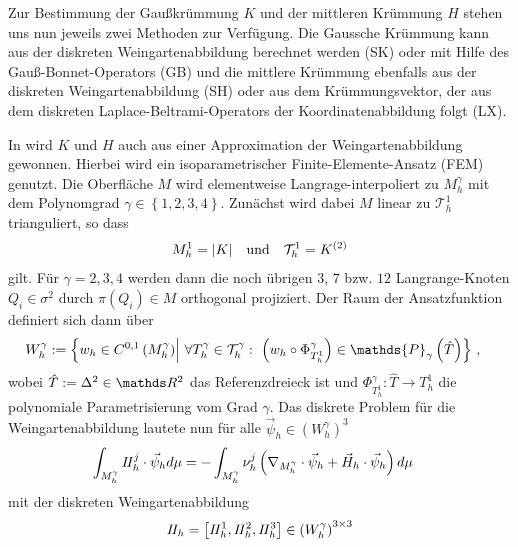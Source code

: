   Zur Bestimmung der Gaußkrümmung \( K \) und der mittleren Krümmung \( H \) stehen uns nun jeweils zwei Methoden zur Verfügung.
  Die Gaussche Krümmung kann aus der diskreten Weingartenabbildung berechnet werden (SK) oder mit Hilfe des Gauß-Bonnet-Operators (GB)
  und die mittlere Krümmung ebenfalls aus der diskreten Weingartenabbildung (SH) oder aus dem Krümmungsvektor, der aus dem diskreten Laplace-Beltrami-Operators der Koordinatenabbildung
  folgt (LX).

  In \cite{heine} wird \( K \) und \( H \) auch aus einer Approximation der Weingartenabbildung gewonnen.
  Hierbei wird ein isoparametrischer Finite-Elemente-Ansatz (FEM) genutzt. 
  Die Oberfläche \( M \) wird elementweise Langrage-interpoliert zu \( M^{\gamma}_{h} \) mit dem Polynomgrad \( \gamma\in\left\{ 1,2,3,4 \right\} \).
  Zunächst wird dabei \( M \) linear zu \(\mathcal{T}^{1}_{h}  \) trianguliert, so dass
  \begin{align}
     M_{h}^{1} = |K|  \quad\text{und}\quad
     \mathcal{T}^{1}_{h} = K^{(2)}
  \end{align}
  gilt.
  Für \( \gamma = 2,3,4 \) werden dann die noch übrigen \( 3 \), \( 7 \) bzw. \( 12 \) Langrange-Knoten \( Q_{i}\in\sigma^{2} \) durch \( \pi\left( Q_{i} \right)\in M \) orthogonal projiziert.
  Der Raum der Ansatzfunktion definiert sich dann über
  \begin{align}
    W_{h}^{\gamma} 
      &:= \left\{ w_{h}\in C^{0,1}\left( M_{h}^{\gamma} \right) \middle|\  
                          \forall T_{h}^{\gamma} \in \mathcal{T}_{h}^{\gamma}:\  \left( w_{h} \circ \Phi_{T_{h}^{1}}^{\gamma}\right) \in \mathds{P}_{\gamma}\left(\hat{T}\right)\right\}
                          \formkomma
  \end{align}
  wobei \( \hat{T}:=\Delta^{2}\in\R^{2} \) das Referenzdreieck ist und 
  \( \Phi_{T_{h}^{1}}^{\gamma}: \hat{T} \rightarrow T_{h}^{1} \)
  die polynomiale Parametrisierung vom Grad \( \gamma \).
  Das diskrete Problem für die Weingartenabbildung lautete nun für alle \( \vec{\psi}_{h}\in \left( W_{h}^{\gamma} \right)^{3} \)
  \begin{align}
    \int_{M_{h}^{\gamma}} I \! I_{h}^{j} \cdot \vec{\psi}_{h} d\mu
        &= -\int_{M_{h}^{\gamma}} \nu_{h}^{j} \left( \nabla_{M_{h}^{\gamma}} \cdot \vec{\psi}_{h} + \vec{H}_{h}\cdot\vec{\psi}_{h} \right) d\mu
  \end{align}
  mit der diskreten Weingartenabbildung 
  \begin{align}
    I \! I_{h} = \left[ I \! I_{h}^{1}, I \! I_{h}^{2}, I \! I_{h}^{3} \right] \in \left( W_{h}^{\gamma} \right)^{3 \times 3}
  \end{align}
